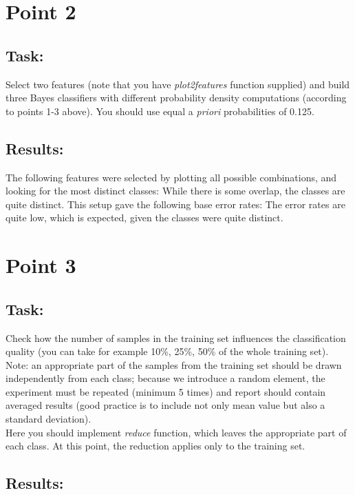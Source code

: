 \documentclass[
  a4paper,            %
  DIV=10,             %
  oneside,            %
  BCOR=5mm,           %
  parskip=half,       %
  numbers=noenddot,   %
  bibtotoc,           %
  listof=totoc        %
]{scrreprt}
\begin{document}
\section*{Point 2}
\subsection*{Task:}
Select two features (note that you have \textit{plot2features} function supplied) and build three Bayes classifiers with different probability density computations (according to points 1-3 above).
You should use equal a \textit{priori} probabilities of 0.125.
\subsection*{Results:}
The following features were selected by plotting all possible combinations, and looking for the most distinct classes:
While there is some overlap, the classes are quite distinct.
This setup gave the following base error rates:
The error rates are quite low, which is expected, given the classes were quite distinct.

\section*{Point 3}
\subsection*{Task:}
Check how the number of samples in the training set influences the classification quality (you can take for example 10\%, 25\%, 50\% of the whole training set).
\\
Note: an appropriate part of the samples from the training set should be drawn independently from each class; because we introduce a random element, the experiment must be repeated (minimum 5 times) and report should contain averaged results (good practice is to include not only mean value but also a standard deviation).
\\
Here you should implement \textit{reduce} function, which leaves the appropriate part of each class.
At this point, the reduction applies only to the training set.
\subsection*{Results:}
\end{document}
